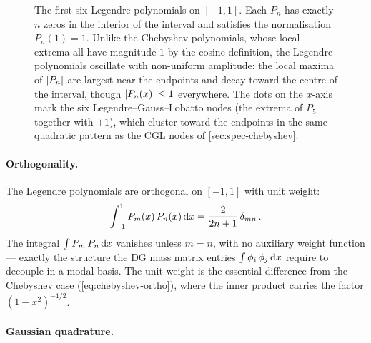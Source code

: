 \begin{figure}[t]
\centering

\caption[Legendre polynomials]{The first six Legendre polynomials on
  $[-1,1]$.  Each $P_n$ has exactly $n$ zeros in the interior of the
  interval and satisfies the normalisation $P_n(1) = 1$.  Unlike the
  Chebyshev polynomials, whose local extrema all have magnitude $1$ by
  the cosine definition, the Legendre polynomials oscillate with
  non-uniform amplitude: the local maxima of $\left\lvert P_n \right\rvert$ are largest
  near the endpoints and decay toward the centre of the interval,
  though $\left\lvert P_n(x) \right\rvert \leq 1$ everywhere.  The dots on the $x$-axis
  mark the six Legendre--Gauss--Lobatto nodes (the extrema of $P_5$
  together with $\pm 1$), which cluster toward the endpoints in the
  same quadratic pattern as the CGL nodes of
  \cref{sec:spec-chebyshev}.}
\label{fig:legendre-polynomials}
\end{figure}

\paragraph{Orthogonality.}

The Legendre polynomials are orthogonal on $[-1,1]$ with unit weight:
%
\begin{equation}
  \int_{-1}^{1} P_m(x)\,P_n(x)\,\mathrm{d} x
  = \frac{2}{2n+1}\,\delta_{mn} \,.
  \label{eq:legendre-ortho}
\end{equation}
%
The integral $\int P_m\,P_n\,\mathrm{d} x$ vanishes unless $m = n$, with no
auxiliary weight function --- exactly the structure the DG mass matrix
entries $\int \phi_i\,\phi_j\,\mathrm{d} x$ require to decouple in a modal
basis.  The unit weight is the essential difference from the Chebyshev
case (\cref{eq:chebyshev-ortho}), where the inner product carries the
factor $(1 - x^2)^{-1/2}$.

\paragraph{Gaussian quadrature.}


